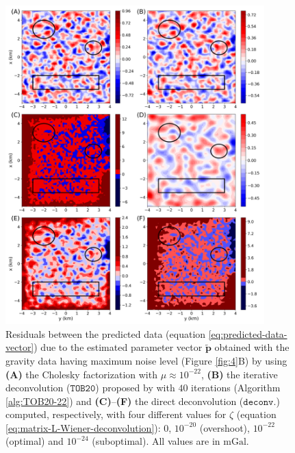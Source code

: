 \begin{figure}[htbp]
	\begin{center}
		\includegraphics[width=10cm]{Fig/stability_grav_comparison}
	\end{center}
	\caption{
		Residuals between the predicted data (equation \ref{eq:predicted-data-vector}) due to the estimated parameter vector
		$\tilde{\mathbf{p}}$ obtained with the gravity data having maximum noise level (Figure \ref{fig:4}B) by using
		\textbf{(A)} the Cholesky factorization with $\mu \approx 10^{-22}$, 
		\textbf{(B)} the iterative deconvolution ($\mathtt{TOB20}$) proposed by \citet{takahashi-etal2020} with $40$ 
		iterations (Algorithm \ref{alg:TOB20-22}) and
		\textbf{(C)}--\textbf{(F)} the direct deconvolution ($\mathtt{deconv.}$) computed, respectively, with four different 
		values for $\zeta$ (equation \ref{eq:matrix-L-Wiener-deconvolution}): $0$, $10^{-20}$ (overshoot), $10^{-22}$ (optimal)
		and $10^{-24}$ (suboptimal).
		All values are in $\mathrm{mGal}$.
		}
	\label{fig:5}
\end{figure}


